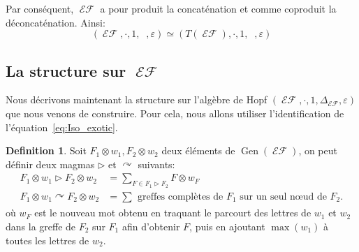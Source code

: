 \documentclass[french]{article}
\theoremstyle{definition}
\newtheorem{defi}{Definition}[section]
\theoremstyle{plain}
\newcommand{\e}{\varepsilon}
\DeclareMathOperator{\Dsh}{{\Delta_{\shuffle}}}
\DeclareMathOperator{\EF}{\mathcal{EF}}
\DeclareMathOperator{\Gen}{Gen}
\begin{document}
Par conséquent, $\EF$ a pour produit la concaténation et comme coproduit la déconcaténation. Ainsi:
\begin{equation}\label{eq:Iso_exotic}
	(\EF,\cdot, 1, \Dsh,\e)\simeq (T(\EF),\cdot, 1, \Dsh,\e)
\end{equation}

\subsection{La structure \PH{} sur $\EF{}$}

Nous décrivons maintenant la structure \PH{} sur l'algèbre de Hopf $(\EF,\cdot, 1, \Delta_{\EF},\e)$ que nous venons de construire. Pour cela, nous allons utiliser l'identification de l'équation~\eqref{eq:Iso_exotic}.


%
%


\begin{defi}
	Soit $F_1\otimes w_1, F_2\otimes w_2$ deux éléments de $\Gen(\EF)$, on peut définir deux magmas $\rhd$ et $\curvearrowright$ suivants:
	\begin{align*}
		F_1\otimes w_1 \rhd F_2\otimes w_2 &= \sum_{F\in F_1\rhd F_2} F \otimes w_F \\
		F_1\otimes w_1 \curvearrowright F_2\otimes w_2 &= \sum_{} \text{ greffes complètes de }F_1 \text{ sur un seul n\oe{}ud de } F_2.
	\end{align*}
	 où $w_F$ est le nouveau mot obtenu en traquant le parcourt des lettres de $w_1$ et $w_2$ dans la greffe de $F_2$ sur $F_1$ afin d'obtenir $F$, puis en ajoutant $\max(w_1)$ à toutes les lettres de $w_2$.
\end{defi}
\end{document}
